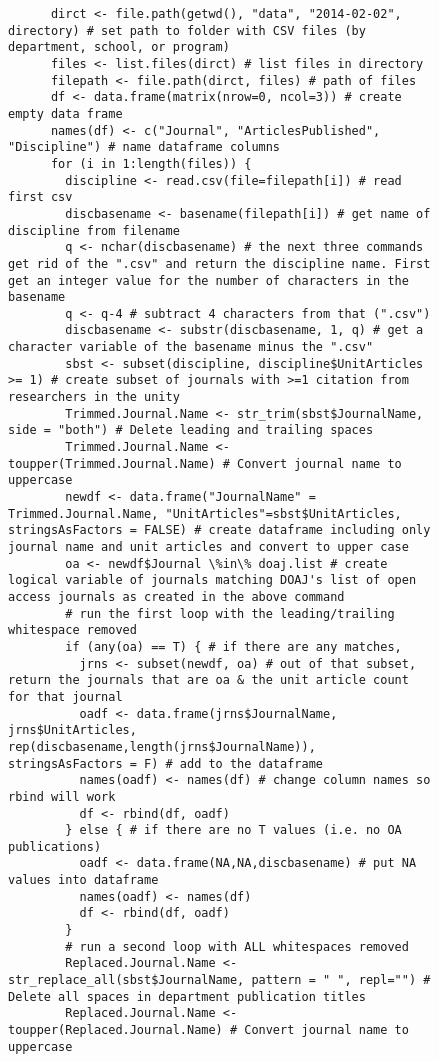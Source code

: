 \documentclass{article}
\begin{document}
\begin{figure}[htpb]
\begin{lstlisting}
	  dirct <- file.path(getwd(), "data", "2014-02-02", directory) # set path to folder with CSV files (by department, school, or program)
	  files <- list.files(dirct) # list files in directory
	  filepath <- file.path(dirct, files) # path of files
	  df <- data.frame(matrix(nrow=0, ncol=3)) # create empty data frame
	  names(df) <- c("Journal", "ArticlesPublished", "Discipline") # name dataframe columns
	  for (i in 1:length(files)) {
	    discipline <- read.csv(file=filepath[i]) # read first csv
	    discbasename <- basename(filepath[i]) # get name of discipline from filename
	    q <- nchar(discbasename) # the next three commands get rid of the ".csv" and return the discipline name. First get an integer value for the number of characters in the basename
	    q <- q-4 # subtract 4 characters from that (".csv")
	    discbasename <- substr(discbasename, 1, q) # get a character variable of the basename minus the ".csv"
	    sbst <- subset(discipline, discipline$UnitArticles >= 1) # create subset of journals with >=1 citation from researchers in the unity
	    Trimmed.Journal.Name <- str_trim(sbst$JournalName, side = "both") # Delete leading and trailing spaces
	    Trimmed.Journal.Name <- toupper(Trimmed.Journal.Name) # Convert journal name to uppercase
	    newdf <- data.frame("JournalName" = Trimmed.Journal.Name, "UnitArticles"=sbst$UnitArticles, stringsAsFactors = FALSE) # create dataframe including only journal name and unit articles and convert to upper case
	    oa <- newdf$Journal \%in\% doaj.list # create logical variable of journals matching DOAJ's list of open access journals as created in the above command
	    # run the first loop with the leading/trailing whitespace removed
	    if (any(oa) == T) { # if there are any matches, 
	      jrns <- subset(newdf, oa) # out of that subset, return the journals that are oa & the unit article count for that journal
	      oadf <- data.frame(jrns$JournalName, jrns$UnitArticles, rep(discbasename,length(jrns$JournalName)), stringsAsFactors = F) # add to the dataframe
	      names(oadf) <- names(df) # change column names so rbind will work
	      df <- rbind(df, oadf)
	    } else { # if there are no T values (i.e. no OA publications)
	      oadf <- data.frame(NA,NA,discbasename) # put NA values into dataframe
	      names(oadf) <- names(df)
	      df <- rbind(df, oadf)
	    }
	    # run a second loop with ALL whitespaces removed
	    Replaced.Journal.Name <- str_replace_all(sbst$JournalName, pattern = " ", repl="") # Delete all spaces in department publication titles
	    Replaced.Journal.Name <- toupper(Replaced.Journal.Name) # Convert journal name to uppercase

\end{lstlisting}
\end{figure}
\end{document}

